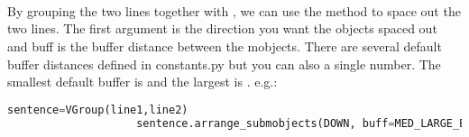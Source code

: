         \paragraph{ \\}
            \hspace*{2em}By grouping the two lines together with , we can use the  method to space out the two lines. The first argument is the direction you want the objects spaced out and buff is the buffer distance between the mobjects. There are several default buffer distances defined in constants.py but you can also a single number. The smallest default buffer is  and the largest is . e.g.:
                \begin{lstlisting}[language = {Python}, gobble = 20]
                    sentence=VGroup(line1,line2)
                    sentence.arrange_submobjects(DOWN, buff=MED_LARGE_BUFF)
                \end{lstlisting}

